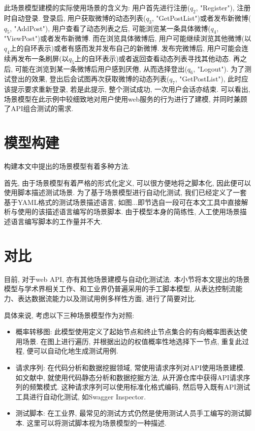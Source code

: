         此场景模型建模的实际使用场景的含义为: 用户首先进行注册($q_2$, "Register"), 注册时自动登录. 登录后, 用户获取微博的动态列表($q_3$, "GetPostList")或者发布新微博($q_5$, "AddPost"), 用户查看了动态列表之后, 可能浏览某一条具体微博($q_4$, "ViewPost")或者发布新微博. 而在浏览具体微博后, 用户可能继续浏览其他微博(以$q_4$上的自环表示)或者有感而发并发布自己的新微博. 发布完微博后, 用户可能会连续再发布一条刷屏(以$q_5$上的自环表示)或者返回查看动态列表寻找其他动态. 再之后, 可能在浏览到某一条微博后用户感到厌倦, 从而选择登出($q_6$, "Logout"). 为了测试登出的效果, 登出后会试图再次获取微博的动态列表($q_7$, "GetPostList"), 此时应该提示要求重新登录, 若是此提示, 整个测试成功, 一次用户会话亦结束. 可以看出, 场景模型在此示例中较细致地对用户使用web服务的行为进行了建模, 并同时兼顾了API组合测试的需求.
    
    \section{模型构建}
        构建本文中提出的场景模型有着多种方法.
        
        首先, 由于场景模型有着严格的形式化定义, 可以很方便地将之脚本化, 因此便可以使用脚本描述测试场景. 为了基于场景模型进行自动化测试, 我们已经定义了一套基于YAML格式的测试场景描述语言, 如图...即节选自一段可在本文工具中直接解析与使用的该描述语言编写的场景脚本. 由于模型本身的简练性, 人工使用场景描述语言编写脚本的工作量并不大.
        
        
        
    \section{对比}
        目前, 对于web API, 亦有其他场景建模与自动化测试法. 本小节将本文提出的场景模型与学术界相关工作、和工业界仍普遍采用的手工脚本模型, 从表达控制流能力、表达数据流能力以及测试用例多样性方面, 进行了简要对比.
    
        具体来说, 考虑以下三种场景模型作为对照:
        \begin{itemize}
            \item 概率转移图\cite{junyiw17}: 此模型使用定义了起始节点和终止节点集合的有向概率图表达使用场景. 在图上进行遍历, 并根据出边的权值概率性地选择下一节点, 重复此过程, 便可以自动化地生成测试用例.
            
            \item 请求序列: 在代码分析和数据挖掘领域, 常使用请求序列对API使用场景建模. 如文献\cite{taox06}\cite{xiaodongg16}中, 就使用代码静态分析和数据挖掘方法, 从开源仓库中获得API请求序列的频繁模式. 这种请求序列可以使用标准化格式编码, 然后导入既有API测试工具进行自动化测试, 如Swagger Inspector\cite{swaggerinspetor17}.
            
            \item 测试脚本: 在工业界, 最常见的测试方式仍然是使用测试人员手工编写的测试脚本. 这里可以将测试脚本视为场景模型的一种描述.
        \end{itemize}
        
